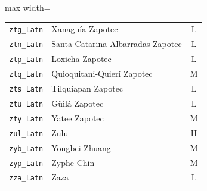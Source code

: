 {\begin{adjustbox}{max width=\textwidth}
\begin{tabular}{llc}
        \texttt{ztg\_Latn} & Xanaguía Zapotec & L \\
        \texttt{ztn\_Latn} & Santa Catarina Albarradas Zapotec & L \\
        \texttt{ztp\_Latn} & Loxicha Zapotec & L \\
        \texttt{ztq\_Latn} & Quioquitani-Quierí Zapotec & M \\
        \texttt{zts\_Latn} & Tilquiapan Zapotec & L \\
        \texttt{ztu\_Latn} & Güilá Zapotec & L \\
        \texttt{zty\_Latn} & Yatee Zapotec & M \\
        \texttt{zul\_Latn} & Zulu & H \\
        \texttt{zyb\_Latn} & Yongbei Zhuang & M \\
        \texttt{zyp\_Latn} & Zyphe Chin & M \\
        \texttt{zza\_Latn} & Zaza & L \\
        \bottomrule
    \end{tabular}
    \end{adjustbox}
}
\label{tab:full_lang_list}